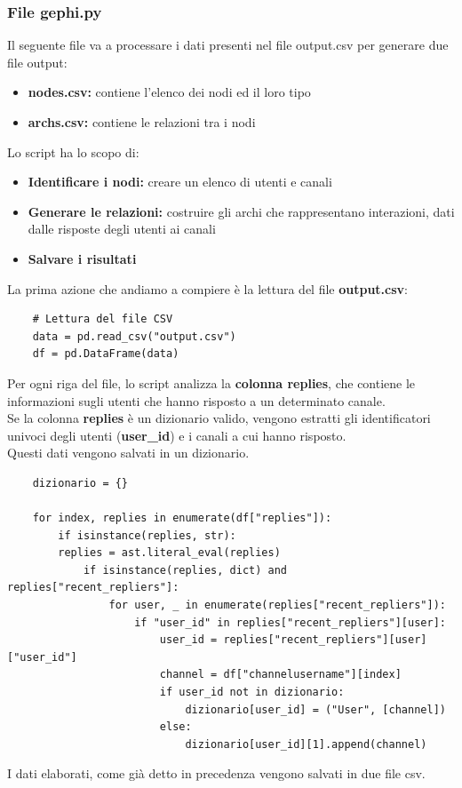 \documentclass[12pt]{article}
\begin{document}
	\subsubsection{File gephi.py}
	Il seguente file va a processare i dati presenti nel file output.csv per generare due file output:
	\begin{itemize}[label=]
		\item \textbf{nodes.csv:} contiene l'elenco dei nodi ed il loro tipo
		\item \textbf{archs.csv:} contiene le relazioni tra i nodi
	\end{itemize}
	Lo script ha lo scopo di:
	\begin{itemize}[label=]
		\item \textbf{Identificare i nodi:} creare un elenco di utenti e canali
		\item \textbf{Generare le relazioni:} costruire gli archi che rappresentano interazioni, dati dalle risposte degli utenti ai canali
		\item \textbf{Salvare i risultati}
	\end{itemize}
	La prima azione che andiamo a compiere è la lettura del file \textbf{output.csv}:
	\begin{lstlisting}
	# Lettura del file CSV
	data = pd.read_csv("output.csv")
	df = pd.DataFrame(data)
	\end{lstlisting}
	Per ogni riga del file, lo script analizza la \textbf{colonna replies}, che contiene le informazioni sugli utenti che hanno risposto a un determinato canale.\\
	Se la colonna \textbf{replies} è un dizionario valido, vengono estratti gli identificatori univoci degli utenti (\textbf{user\_id}) e i canali a cui hanno risposto.\\
	Questi dati vengono salvati in un dizionario.
	\begin{lstlisting}
	dizionario = {}
		
	for index, replies in enumerate(df["replies"]):
		if isinstance(replies, str):
		replies = ast.literal_eval(replies)
			if isinstance(replies, dict) and replies["recent_repliers"]:
				for user, _ in enumerate(replies["recent_repliers"]):
					if "user_id" in replies["recent_repliers"][user]:
						user_id = replies["recent_repliers"][user]["user_id"]
						channel = df["channelusername"][index]
						if user_id not in dizionario:
							dizionario[user_id] = ("User", [channel])
						else:
							dizionario[user_id][1].append(channel)
	\end{lstlisting}
	I dati elaborati, come già detto in precedenza vengono salvati in due file csv.
\end{document}
